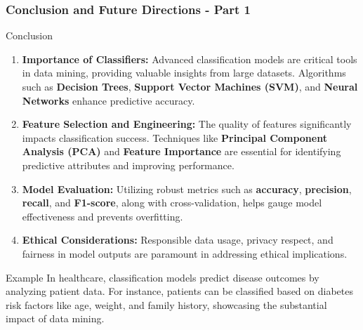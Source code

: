 \documentclass[aspectratio=169]{beamer}
\begin{document}
\begin{frame}[fragile]
    \frametitle{Conclusion and Future Directions - Part 1}
    \begin{block}{Conclusion}
        \begin{enumerate}
            \item \textbf{Importance of Classifiers:} Advanced classification models are critical tools in data mining, providing valuable insights from large datasets. Algorithms such as \textbf{Decision Trees}, \textbf{Support Vector Machines (SVM)}, and \textbf{Neural Networks} enhance predictive accuracy.
            
            \item \textbf{Feature Selection and Engineering:} The quality of features significantly impacts classification success. Techniques like \textbf{Principal Component Analysis (PCA)} and \textbf{Feature Importance} are essential for identifying predictive attributes and improving performance.
            
            \item \textbf{Model Evaluation:} Utilizing robust metrics such as \textbf{accuracy}, \textbf{precision}, \textbf{recall}, and \textbf{F1-score}, along with cross-validation, helps gauge model effectiveness and prevents overfitting.
            
            \item \textbf{Ethical Considerations:} Responsible data usage, privacy respect, and fairness in model outputs are paramount in addressing ethical implications.
        \end{enumerate}
    \end{block}
    
    \begin{block}{Example}
        In healthcare, classification models predict disease outcomes by analyzing patient data. For instance, patients can be classified based on diabetes risk factors like age, weight, and family history, showcasing the substantial impact of data mining.
    \end{block}
\end{frame}
\end{document}
